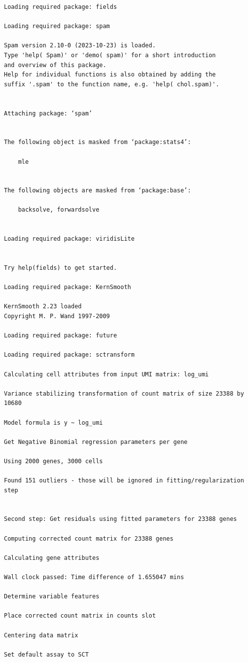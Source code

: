 \documentclass[
  letterpaper,
  DIV=11,
  numbers=noendperiod]{scrartcl}
\begin{document}
\begin{verbatim}
Loading required package: fields

Loading required package: spam

Spam version 2.10-0 (2023-10-23) is loaded.
Type 'help( Spam)' or 'demo( spam)' for a short introduction 
and overview of this package.
Help for individual functions is also obtained by adding the
suffix '.spam' to the function name, e.g. 'help( chol.spam)'.


Attaching package: ‘spam’


The following object is masked from ‘package:stats4’:

    mle


The following objects are masked from ‘package:base’:

    backsolve, forwardsolve


Loading required package: viridisLite


Try help(fields) to get started.

Loading required package: KernSmooth

KernSmooth 2.23 loaded
Copyright M. P. Wand 1997-2009

Loading required package: future

Loading required package: sctransform

Calculating cell attributes from input UMI matrix: log_umi

Variance stabilizing transformation of count matrix of size 23388 by 10680

Model formula is y ~ log_umi

Get Negative Binomial regression parameters per gene

Using 2000 genes, 3000 cells

Found 151 outliers - those will be ignored in fitting/regularization step


Second step: Get residuals using fitted parameters for 23388 genes

Computing corrected count matrix for 23388 genes

Calculating gene attributes

Wall clock passed: Time difference of 1.655047 mins

Determine variable features

Place corrected count matrix in counts slot

Centering data matrix

Set default assay to SCT


\end{verbatim}
\end{document}
